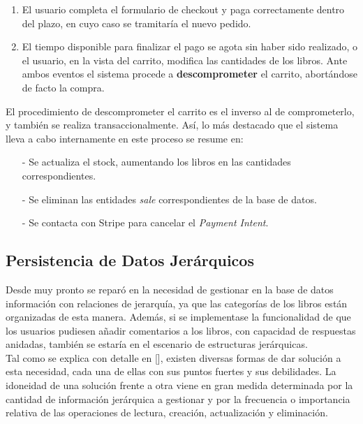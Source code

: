 \documentclass[a4paper]{report}
\begin{document}
    \begin{enumerate}
    	\item El usuario completa el formulario de checkout y paga correctamente dentro del plazo, en cuyo caso se tramitaría el nuevo pedido.
    	\item El tiempo disponible para finalizar el pago se agota sin haber sido realizado, o el usuario, en la vista del carrito, modifica las cantidades de los libros. Ante ambos eventos el sistema procede a \textbf{descomprometer} el carrito, abortándose de facto la compra.
    \end{enumerate}
    
    El procedimiento de descomprometer el carrito es el inverso al de comprometerlo, y también se realiza transaccionalmente. Así, lo más destacado que el sistema lleva a cabo internamente en este proceso se resume en:
    
    \begin{itemize}
    	\item[-] Se actualiza el stock, aumentando los libros en las cantidades correspondientes.
    	\item[-] Se eliminan las entidades \emph{sale} correspondientes de la base de datos.
    	\item[-] Se contacta con Stripe para cancelar el \emph{Payment Intent}.
    \end{itemize}

    \subsection{Persistencia de Datos Jerárquicos}
    Desde muy pronto se reparó en la necesidad de gestionar en la base de datos información con relaciones de jerarquía, ya que las categorías de los libros están organizadas de esta manera. Además, si se implementase la funcionalidad de que los usuarios pudiesen añadir comentarios a los libros, con capacidad de respuestas anidadas, también se estaría en el escenario de estructuras jerárquicas.
    \\
    
    Tal como se explica con detalle en [], existen diversas formas de dar solución a esta necesidad, cada una de ellas con sus puntos fuertes y sus debilidades. La idoneidad de una solución frente a otra viene en gran medida determinada por la cantidad de información jerárquica a gestionar y por la frecuencia o importancia relativa de las operaciones de lectura, creación, actualización y eliminación.
    \\
    
\end{document}
